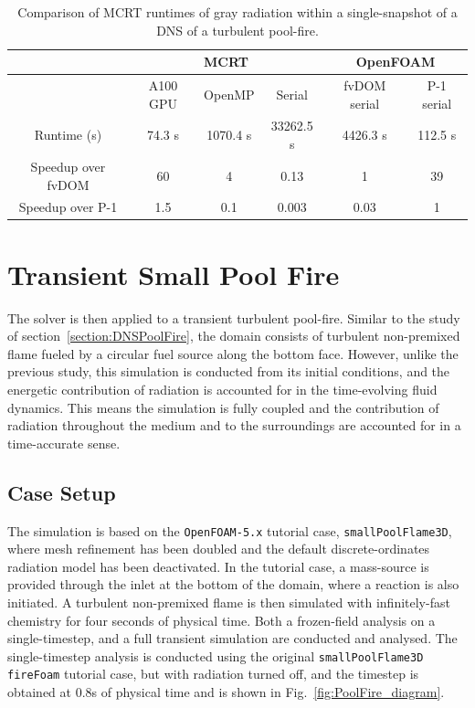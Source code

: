 \begin{table}
\caption{Comparison of MCRT runtimes of gray radiation within a single-snapshot of a DNS of a turbulent pool-fire.}
\label{table:PoolFireRuntimesGray}
\centering
\begin{tabular}{c c c c c c} 
\hline
&\multicolumn{3}{c}{\bfseries MCRT}&\multicolumn{2}{c}{\bfseries OpenFOAM} \\
 \hline
 ~ & A100 GPU & OpenMP & Serial & fvDOM serial & P-1 serial \\ [0.5ex] 
 \hline
 Runtime (s) & 74.3 s & 1070.4 s & 33262.5 s & 4426.3 s & 112.5 s \\ 
 Speedup over fvDOM & 60 & 4 & 0.13 & 1 & 39 \\
 Speedup over P-1 & 1.5 & 0.1 & 0.003 & 0.03 & 1 \\
 \hline
\end{tabular}
\end{table}



\section{Transient Small Pool Fire}\label{section:SmallPoolFlame}
The solver is then applied to a transient turbulent pool-fire. Similar to the study of section~\ref{section:DNSPoolFire}, the domain consists of turbulent non-premixed flame fueled by a circular fuel source along the bottom face. However, unlike the previous study, this simulation is conducted from its initial conditions, and the energetic contribution of radiation is accounted for in the time-evolving fluid dynamics. This means the simulation is fully coupled and the contribution of radiation throughout the medium and to the surroundings are accounted for in a time-accurate sense. 

\subsection{Case Setup}
The simulation is based on the \verb|OpenFOAM-5.x| tutorial case, \texttt{smallPoolFlame3D}, where mesh refinement has been doubled and the default discrete-ordinates radiation model has been deactivated. 
In the tutorial case, a mass-source is provided through the inlet at the bottom of the domain, where a reaction is also initiated. A turbulent non-premixed flame is then simulated with infinitely-fast chemistry for four seconds of physical time.
Both a frozen-field analysis on a single-timestep, and a full transient simulation are conducted and analysed. The single-timestep analysis is conducted using the original \texttt{smallPoolFlame3D} \verb|fireFoam| tutorial case, but with radiation turned off, and the timestep is obtained at 0.8s of physical time and is shown in Fig.~\ref{fig:PoolFire_diagram}.

